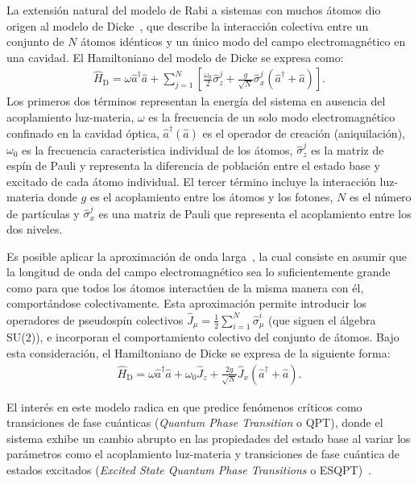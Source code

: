 \documentclass[onecolumn,notitlepage,letterpaper,aps,pra,12pt]{article}
\numberwithin{equation}{section}
\begin{document}
La extensión natural del modelo de Rabi a sistemas con muchos átomos dio origen al modelo de Dicke~\cite{Dicke54}, que describe la interacción colectiva entre un conjunto de $N$ átomos idénticos y un único modo del campo electromagnético en una cavidad. El Hamiltoniano del modelo de Dicke se expresa como:
\begin{gather}
    \hat{H}_{\text{D}} = \omega\hat{a}^{\dagger}\hat{a} + \sum_{j=1}^{N}\left[ \frac{\omega_{0}}{2}\hat{\sigma}_{z}^{j} + \frac{g}{\sqrt{N}}\hat{\sigma}_{x}^{j}\left(\hat{a}^{\dagger} + \hat{a}\right) \right].
\end{gather}
Los primeros dos términos representan la energía del sistema en ausencia del acoplamiento luz-materia, $\omega$ es la frecuencia de un solo modo electromagnético confinado en la cavidad óptica, $\hat{a}^{\dagger}(\hat{a})$ es el operador de creación (aniquilación), $\omega_{0}$ es la frecuencia caracteristica individual de los átomos, $\hat{\sigma}_{z}^{j}$ es la matriz de espín de Pauli  y representa la diferencia de población entre el estado base y excitado de cada átomo individual. El tercer término incluye la interacción luz-materia donde $g$ es el acoplamiento entre los átomos y los fotones,  $N$ es el número de partículas y $\hat{\sigma}_{x}^{j}$ es una matriz de Pauli que representa el acoplamiento entre los dos niveles. 

Es posible aplicar la aproximación de onda larga~\cite{Dicke54}, la cual consiste en asumir que la longitud de onda del campo electromagnético  sea lo suficientemente grande como para que todos los átomos interactúen de la misma manera con él, comportándose colectivamente. Esta aproximación permite introducir los operadores de pseudospín colectivos  $\hat{J}_{\mu} = \frac{1}{2}\sum_{i=1}^{N}\hat{\sigma}_{\mu}^{i}$ (que siguen el álgebra SU(2)),  e incorporan el comportamiento colectivo del conjunto de átomos. Bajo esta consideración, el Hamiltoniano de Dicke se expresa de la siguiente forma: 
\begin{gather}\label{Dicke colectivo}
    \hat{H}_{\text{D}} = \omega\hat{a}^{\dagger}\hat{a} + \omega_{0}\hat{J}_{z} + \frac{2g}{\sqrt{N}}\hat{J}_{x}\left( \hat{a}^{\dagger} + \hat{a} \right).
\end{gather}


El interés en este modelo  radica en que predice fenómenos críticos como transiciones de fase cuánticas (\textit{Quantum Phase Transition} o QPT), donde el sistema exhibe un cambio abrupto en las propiedades del estado base al variar los parámetros como el acoplamiento luz-materia y transiciones de fase cuántica de estados excitados (\textit{Excited State Quantum Phase Transitions} o ESQPT)~\cite{Hepp73,wang1973,hioe1973,Sachdev99,Larson17}. 
\end{document}
